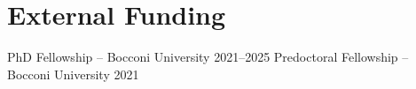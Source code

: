 \section{External Funding}
\resumeSubHeadingListStart
\resumeSubheading
  {{\normalfont PhD Fellowship -- Bocconi University}}{}
  {}{2021--2025}
  \vspace{-6mm}
\resumeSubheading
  {{\normalfont Predoctoral Fellowship -- Bocconi University}}{}
  {}{2021}
\resumeSubHeadingListEnd

\vspace{-4.0mm}
